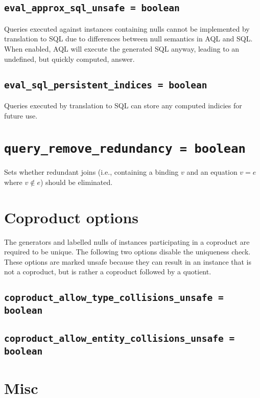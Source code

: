 \documentclass[10pt]{book}
\begin{document}
\subsection{{\tt eval\_approx\_sql\_unsafe = boolean}}

Queries executed against instances containing nulls cannot be implemented by translation to SQL due to differences between null semantics in AQL and SQL.  
When enabled, AQL will execute the generated SQL anyway, leading to an undefined, but quickly computed, answer.  

\subsection{{\tt eval\_sql\_persistent\_indices = boolean}}

Queries executed by translation to SQL can store any computed indicies for future use. 

\section{{\tt query\_remove\_redundancy = boolean}}

Sets whether redundant joins (i.e., containing a binding $v$ and an equation $v = e$ where $v \notin e$) should be eliminated.
\section{Coproduct options}

The generators and labelled nulls of instances participating in a coproduct are required to be unique.  The following two options disable the uniqueness check.  These options are marked unsafe because they can result in an instance that is not a coproduct, but is rather a coproduct followed by a quotient.

\subsection{{\tt coproduct\_allow\_type\_collisions\_unsafe = boolean}}

\subsection{{\tt coproduct\_allow\_entity\_collisions\_unsafe = boolean}}

\section{Misc}
\end{document}
